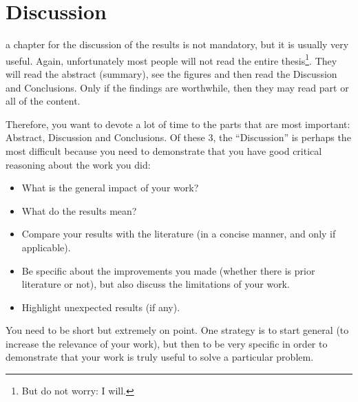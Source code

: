 \chapter{Discussion}
\label{chp:discussion}

 a chapter for the discussion of the results is not mandatory, but it is usually very useful. Again, unfortunately most people will not read the entire thesis\footnote{But do not worry: I will.}. They will read the abstract (summary), see the figures and then read the Discussion and Conclusions. Only if the findings are worthwhile, then they may read part or all of the content.

Therefore, you want to devote a lot of time to the parts that are most important: Abstract, Discussion and Conclusions. Of these 3, the ``Discussion'' is perhaps the most difficult because you need to demonstrate that you have good critical reasoning about the work you did:

\begin{itemize}
	\item What is the general impact of your work?
	\item What do the results mean?
	\item Compare your results with the literature (in a concise manner, and only if applicable).
	\item Be specific about the improvements you made (whether there is prior literature or not), but also discuss the limitations of your work.
	\item Highlight unexpected results (if any).
\end{itemize}

You need to be short but extremely on point. One strategy is to start general (to increase the relevance of your work), but then to be very specific in order to demonstrate that your work is truly useful to solve a particular problem.

